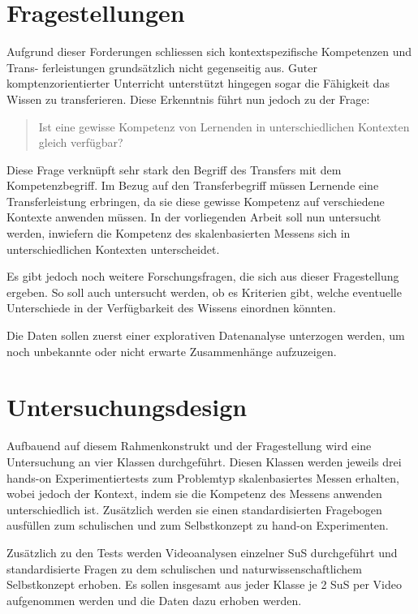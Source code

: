 \documentclass[paper=a4, fontsize=12pt, parskip=half]{scrartcl} %
\begin{document}
\section{Fragestellungen}

Aufgrund dieser Forderungen schliessen sich kontextspezifische Kompetenzen und Trans-
ferleistungen grundsätzlich nicht gegenseitig aus. Guter komptenzorientierter Unterricht
unterstützt hingegen sogar die Fähigkeit das Wissen zu transferieren. Diese Erkenntnis
führt nun jedoch zu der Frage:


\begin{quote}
Ist eine gewisse Kompetenz von Lernenden in unterschiedlichen Kontexten
gleich verfügbar?
\end{quote}
Diese Frage verknüpft sehr stark den Begriff des Transfers mit dem Kompetenzbegriff.
Im Bezug auf den Transferbegriff müssen Lernende eine Transferleistung
erbringen, da sie diese gewisse Kompetenz auf verschiedene Kontexte anwenden müssen.
In der vorliegenden Arbeit soll nun untersucht werden, inwiefern die Kompetenz des skalenbasierten Messens sich in unterschiedlichen Kontexten unterscheidet.


Es gibt jedoch noch weitere Forschungsfragen, die sich aus dieser Fragestellung ergeben. So soll auch untersucht werden, ob es Kriterien gibt, welche eventuelle Unterschiede in der Verfügbarkeit des Wissens einordnen könnten.

Die Daten sollen zuerst einer explorativen Datenanalyse unterzogen werden, um noch unbekannte oder nicht erwarte Zusammenhänge aufzuzeigen. 

\section{Untersuchungsdesign}

Aufbauend auf diesem Rahmenkonstrukt und der Fragestellung wird eine Untersuchung an vier Klassen durchgeführt. Diesen Klassen werden jeweils drei hands-on Experimentiertests zum Problemtyp skalenbasiertes Messen \citep{Metzger2013} erhalten, wobei jedoch der Kontext, indem sie die Kompetenz des Messens anwenden unterschiedlich ist. Zusätzlich werden sie einen standardisierten Fragebogen ausfüllen zum schulischen und zum Selbstkonzept zu hand-on Experimenten. 

Zusätzlich zu den Tests werden Videoanalysen einzelner SuS durchgeführt und standardisierte Fragen zu dem schulischen und naturwissenschaftlichem Selbstkonzept erhoben. Es sollen insgesamt aus jeder Klasse je 2 SuS per Video aufgenommen werden und die Daten dazu erhoben werden.
\end{document}

